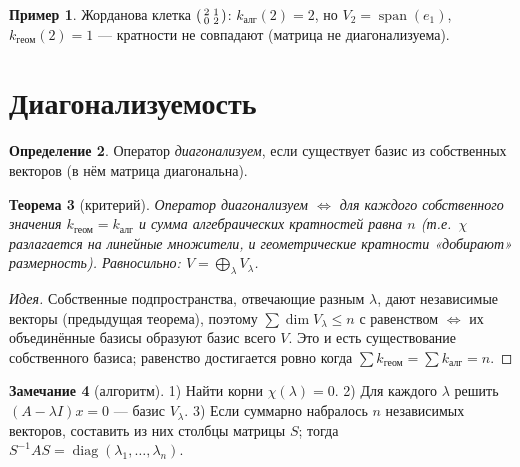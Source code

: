 \documentclass[11pt,a4paper]{article}
\theoremstyle{definition}
\newtheorem{definition}{Определение}[section]
\newtheorem{example}[definition]{Пример}
\newtheorem{remark}[definition]{Замечание}
\theoremstyle{plain}
\newtheorem{theorem}[definition]{Теорема}
\DeclareMathOperator{\Span}{span}
\renewcommand{\le}{\leqslant}
\begin{document}
\begin{example}
Жорданова клетка $\begin{psmallmatrix}2&1\\0&2\end{psmallmatrix}$: $k_{\text{алг}}(2)=2$, но
$V_2=\Span(e_1)$, $k_{\text{геом}}(2)=1$ — кратности не совпадают (матрица не диагонализуема).
\end{example}

\section{Диагонализуемость}

\begin{definition}
Оператор \emph{диагонализуем}, если существует базис из собственных векторов (в нём матрица
диагональна).
\end{definition}

\begin{theorem}[критерий]
Оператор диагонализуем $\iff$ для каждого собственного значения
$k_{\text{геом}}=k_{\text{алг}}$ и сумма алгебраических кратностей равна $n$ (т.е.\ $\chi$
разлагается на линейные множители, и геометрические кратности «добирают» размерность). Равносильно:
$V=\bigoplus_\lambda V_\lambda$.
\end{theorem}

\begin{proof}[Идея]
Собственные подпространства, отвечающие разным $\lambda$, дают независимые векторы (предыдущая
теорема), поэтому $\sum\dim V_\lambda\le n$ с равенством $\iff$ их объединённые базисы образуют
базис всего $V$. Это и есть существование собственного базиса; равенство достигается ровно когда
$\sum k_{\text{геом}}=\sum k_{\text{алг}}=n$.
\end{proof}

\begin{remark}[алгоритм]
1) Найти корни $\chi(\lambda)=0$. 2) Для каждого $\lambda$ решить $(A-\lambda I)x=0$ — базис
$V_\lambda$. 3) Если суммарно набралось $n$ независимых векторов, составить из них столбцы матрицы
$S$; тогда $S^{-1}AS=\operatorname{diag}(\lambda_1,\dots,\lambda_n)$.
\end{remark}
\end{document}
